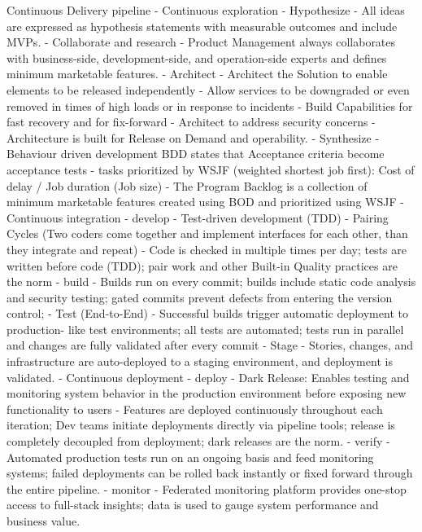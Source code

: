 Continuous Delivery pipeline
- Continuous exploration
  - Hypothesize
    - All ideas are expressed as hypothesis statements with measurable outcomes and include MVPs.
  - Collaborate and research
    - Product Management always collaborates with business-side, development-side, and operation-side experts and defines minimum marketable features.
  - Architect
    - Architect the Solution to enable elements to be released independently
    - Allow services to be downgraded or even removed in times of high loads or in response to incidents
    - Build Capabilities for fast recovery and for fix-forward
    - Architect to address security concerns
    - Architecture is built for Release on Demand and operability.
  - Synthesize
    - Behaviour driven development BDD states that Acceptance criteria become acceptance tests
    - tasks prioritized by WSJF (weighted shortest job first): Cost of delay / Job duration (Job size)
    - The Program Backlog is a collection of minimum marketable features created using BOD and prioritized using WSJF
- Continuous integration
  - develop
    - Test-driven development (TDD)
    - Pairing Cycles (Two coders come together and implement interfaces for each other, than they integrate and repeat)
    - Code is checked in multiple times per day; tests are written before code (TDD); pair work and other Built-in Quality practices are the norm
  - build
    - Builds run on every commit; builds include static code analysis and security testing; gated commits prevent defects from entering the version control;
  - Test (End-to-End)
    - Successful builds trigger automatic deployment to production- like test environments; all tests are automated; tests run in parallel and changes are fully validated after every commit
  - Stage
    - Stories, changes, and infrastructure are auto-deployed to a staging environment, and deployment is validated.
- Continuous deployment
  - deploy
    - Dark Release: Enables testing and monitoring system behavior in the production environment before exposing new functionality to users
    - Features are deployed continuously throughout each iteration; Dev teams initiate deployments directly via pipeline tools; release is completely decoupled from deployment; dark releases are the norm.
  - verify
    - Automated production tests run on an ongoing basis and feed monitoring systems; failed deployments can be rolled back instantly or fixed forward through the entire pipeline.
  - monitor
    - Federated monitoring platform provides one-stop access to full-stack insights; data is used to gauge system performance and business value.
